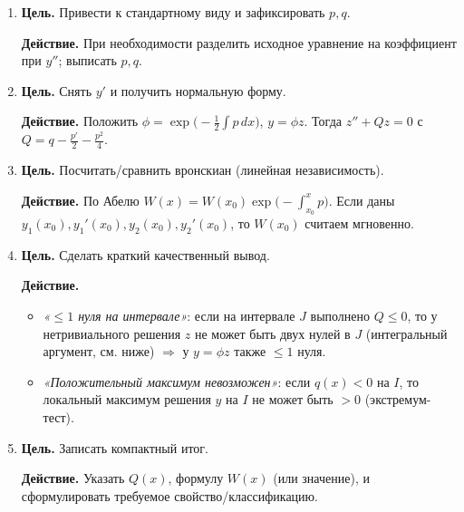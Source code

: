 \begin{enumerate}
\item \textbf{Цель.} Привести к стандартному виду и зафиксировать $p,q$.

    \textbf{Действие.} При необходимости разделить исходное уравнение на коэффициент при $y''$; выписать $p,q$.

\item \textbf{Цель.} Снять $y'$ и получить нормальную форму.

    \textbf{Действие.} Положить $\displaystyle \phi=\exp\!\big(-\tfrac12\int p\,dx\big)$, $y=\phi z$.
    Тогда $z''+Qz=0$ с $Q=q-\tfrac{p'}{2}-\tfrac{p^2}{4}$.

\item \textbf{Цель.} Посчитать/сравнить вронскиан (линейная независимость).

    \textbf{Действие.} По Абелю $\displaystyle W(x)=W(x_0)\exp\!\bigl(-\int_{x_0}^{x} p\bigr)$.
    Если даны $y_1(x_0),y_1'(x_0),y_2(x_0),y_2'(x_0)$, то $W(x_0)$ считаем мгновенно.

\item \textbf{Цель.} Сделать краткий качественный вывод.

    \textbf{Действие.}
    \begin{itemize}
    \item \emph{«$\le 1$ нуля на интервале»}: если на интервале $J$ выполнено $Q\le 0$, то у нетривиального решения $z$ не может быть двух нулей в $J$ (интегральный аргумент, см. ниже) $\Rightarrow$ у $y=\phi z$ также $\le1$ нуля.
    \item \emph{«Положительный максимум невозможен»}: если $q(x)<0$ на $I$, то локальный максимум решения $y$ на $I$ не может быть $>0$ (экстремум-тест).
    \end{itemize}

\item \textbf{Цель.} Записать компактный итог.

    \textbf{Действие.} Указать $Q(x)$, формулу $W(x)$ (или значение), и сформулировать требуемое свойство/классификацию.
\end{enumerate}
